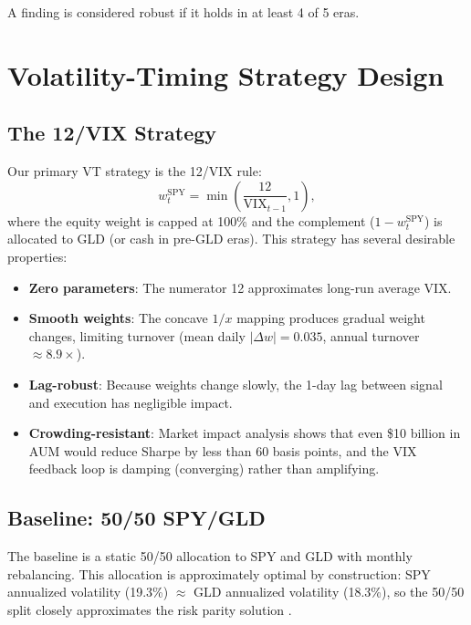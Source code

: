 \documentclass[12pt,a4paper]{article}
\begin{document}
A finding is considered robust if it holds in at least 4 of 5 eras.


\section{Volatility-Timing Strategy Design}
\label{sec:strategy}

\subsection{The 12/VIX Strategy}

Our primary VT strategy is the 12/VIX rule:
\begin{equation}
w_t^{\text{SPY}} = \min\left(\frac{12}{\text{VIX}_{t-1}}, 1\right),
\label{eq:12vix}
\end{equation}
where the equity weight is capped at 100\% and the complement ($1 - w_t^{\text{SPY}}$) is allocated to GLD (or cash in pre-GLD eras). This strategy has several desirable properties:
\begin{itemize}
    \item \textbf{Zero parameters}: The numerator 12 approximates long-run average VIX.
    \item \textbf{Smooth weights}: The concave $1/x$ mapping produces gradual weight changes, limiting turnover (mean daily $|\Delta w| = 0.035$, annual turnover $\approx 8.9\times$).
    \item \textbf{Lag-robust}: Because weights change slowly, the 1-day lag between signal and execution has negligible impact.
    \item \textbf{Crowding-resistant}: Market impact analysis shows that even \$10 billion in AUM would reduce Sharpe by less than 60 basis points, and the VIX feedback loop is damping (converging) rather than amplifying.
\end{itemize}

\subsection{Baseline: 50/50 SPY/GLD}

The baseline is a static 50/50 allocation to SPY and GLD with monthly rebalancing. This allocation is approximately optimal by construction: SPY annualized volatility (19.3\%) $\approx$ GLD annualized volatility (18.3\%), so the 50/50 split closely approximates the risk parity solution \citep{maillard2010}.
\end{document}
